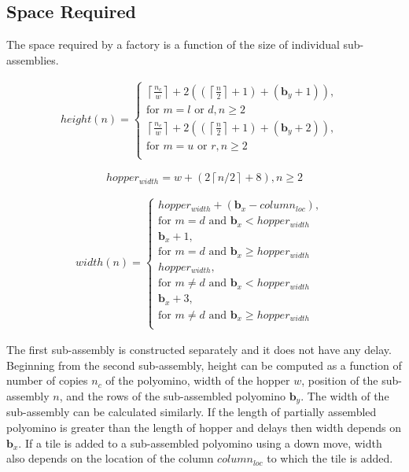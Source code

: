 \subsection{Space Required}\label{sec:requiredSpace}
The space required by a factory is a function of the size of individual sub-assemblies.


\begin{align}
height(n)=
\begin{cases}
\left \lceil{   \frac{n_c}{w}}\right \rceil+2((\left \lceil{\frac{n}{2}}\right \rceil+1)+(\mathbf{b}_y+1)),&\\ 
\text{for } m = l \text{ or } d, n \geq 2&\\
\left \lceil{\frac{n_c}{w}}\right \rceil+2((\left \lceil{\frac{n}{2}}\right \rceil+1)+(\mathbf{b}_y+2)),&\\ 
\text{for } m = u \text{ or } r, n\geq 2&\\
\end{cases}
\end{align}



\begin{equation}
hopper_{width}=w+(2\left \lceil{n/2}\right \rceil+8),  n \geq 2
\end{equation}

\begin{align}
width(n)=
\begin{cases}
hopper_{width}+(\mathbf{b}_x-column_{loc}),&\\ 
\text{for } m = d \text{ and } \mathbf{b}_x < hopper_{width}&\\
\mathbf{b}_x + 1,&\\ 
\text{for } m = d \text{ and } \mathbf{b}_x \geq hopper_{width}&\\
hopper_{width},&\\ 
\text{for } m \neq d  \text{ and } \mathbf{b}_x < hopper_{width}&\\
\mathbf{b}_x + 3,&\\ 
\text{for } m \neq d \text{ and } \mathbf{b}_x \geq hopper_{width}&\\
\end{cases}
\end{align}

The first sub-assembly is constructed separately and it does not have any delay.
Beginning from the second sub-assembly, height can be computed as a function of number of copies $n_c$ of the polyomino, width of the hopper $w$, position of the sub-assembly $n$, and the rows of the sub-assembled polyomino $\mathbf{b}_y$.
The width of the sub-assembly can be calculated similarly. 
If the length of partially assembled polyomino is greater than the length of hopper and delays then width depends on $\mathbf{b}_x$. 
If a tile is added to a sub-assembled polyomino using a down move, width also depends on the location of the column $column_{loc}$ to which the tile is added.  

